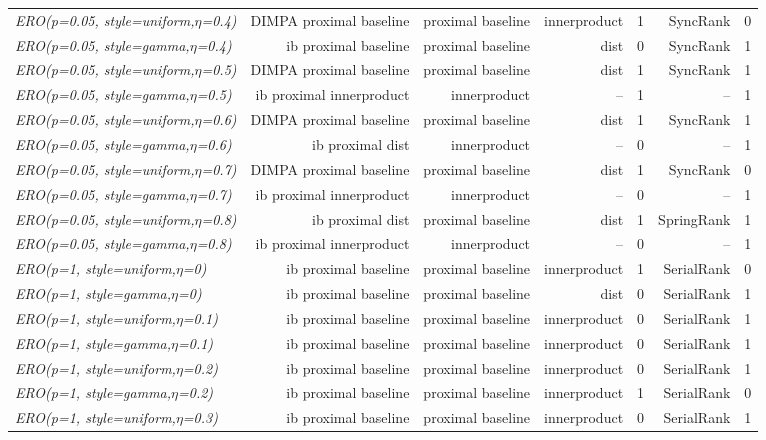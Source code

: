 \documentclass[nohyperref]{article}
\theoremstyle{plain}
\theoremstyle{definition}
\theoremstyle{remark}
\begin{document}
\begin{table*}[!ht]
{\begin{tabular}{lrrrrrr}
			{\it ERO(p=0.05, style=uniform,$\eta$=0.4)} & DIMPA proximal baseline & proximal baseline & innerproduct & 1 & SyncRank & 0 \\
			{\it ERO(p=0.05, style=gamma,$\eta$=0.4)} & ib proximal baseline & proximal baseline & dist & 0 & SyncRank & 1 \\
			{\it ERO(p=0.05, style=uniform,$\eta$=0.5)} & DIMPA proximal baseline & proximal baseline & dist & 1 & SyncRank & 1 \\
			{\it ERO(p=0.05, style=gamma,$\eta$=0.5)} & ib proximal innerproduct & innerproduct & -- & 1 & -- & 1 \\
			{\it ERO(p=0.05, style=uniform,$\eta$=0.6)} & DIMPA proximal baseline & proximal baseline & dist & 1 & SyncRank & 1 \\
			{\it ERO(p=0.05, style=gamma,$\eta$=0.6)} & ib proximal dist & innerproduct & -- & 0 & -- & 1 \\
			{\it ERO(p=0.05, style=uniform,$\eta$=0.7)} & DIMPA proximal baseline & proximal baseline & dist & 1 & SyncRank & 0 \\
			{\it ERO(p=0.05, style=gamma,$\eta$=0.7)} & ib proximal innerproduct & innerproduct & -- & 0 & -- & 1 \\
			{\it ERO(p=0.05, style=uniform,$\eta$=0.8)} & ib proximal dist & proximal baseline & dist & 1 & SpringRank & 1 \\
			{\it ERO(p=0.05, style=gamma,$\eta$=0.8)} & ib proximal innerproduct & innerproduct & -- & 0 & -- & 1 \\
			{\it ERO(p=1, style=uniform,$\eta$=0)} & ib proximal baseline & proximal baseline & innerproduct & 1 & SerialRank & 0 \\
			{\it ERO(p=1, style=gamma,$\eta$=0)} & ib proximal baseline & proximal baseline & dist & 0 & SerialRank & 1 \\
			{\it ERO(p=1, style=uniform,$\eta$=0.1)} & ib proximal baseline & proximal baseline & innerproduct & 0 & SerialRank & 1 \\
			{\it ERO(p=1, style=gamma,$\eta$=0.1)} & ib proximal baseline & proximal baseline & innerproduct & 0 & SerialRank & 1 \\
			{\it ERO(p=1, style=uniform,$\eta$=0.2)} & ib proximal baseline & proximal baseline & innerproduct & 0 & SerialRank & 1 \\
			{\it ERO(p=1, style=gamma,$\eta$=0.2)} & ib proximal baseline & proximal baseline & innerproduct & 1 & SerialRank & 0 \\
			{\it ERO(p=1, style=uniform,$\eta$=0.3)} & ib proximal baseline & proximal baseline & innerproduct & 0 & SerialRank & 1 \\

\end{tabular}}
\end{table*}
\end{document}
